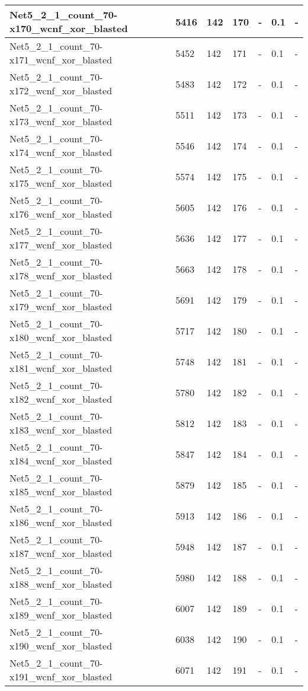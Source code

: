 \begin{scriptsize}
\begin{longtable}{|p{5cm}|l|l|l|l|l|l|}
Net5\_2\_1\_count\_70-x170\_wcnf\_xor\_blasted&5416&142&170&-&0.1&- \\ \hline 
Net5\_2\_1\_count\_70-x171\_wcnf\_xor\_blasted&5452&142&171&-&0.1&- \\ \hline 
Net5\_2\_1\_count\_70-x172\_wcnf\_xor\_blasted&5483&142&172&-&0.1&- \\ \hline 
Net5\_2\_1\_count\_70-x173\_wcnf\_xor\_blasted&5511&142&173&-&0.1&- \\ \hline 
Net5\_2\_1\_count\_70-x174\_wcnf\_xor\_blasted&5546&142&174&-&0.1&- \\ \hline 
Net5\_2\_1\_count\_70-x175\_wcnf\_xor\_blasted&5574&142&175&-&0.1&- \\ \hline 
Net5\_2\_1\_count\_70-x176\_wcnf\_xor\_blasted&5605&142&176&-&0.1&- \\ \hline 
Net5\_2\_1\_count\_70-x177\_wcnf\_xor\_blasted&5636&142&177&-&0.1&- \\ \hline 
Net5\_2\_1\_count\_70-x178\_wcnf\_xor\_blasted&5663&142&178&-&0.1&- \\ \hline 
Net5\_2\_1\_count\_70-x179\_wcnf\_xor\_blasted&5691&142&179&-&0.1&- \\ \hline 
Net5\_2\_1\_count\_70-x180\_wcnf\_xor\_blasted&5717&142&180&-&0.1&- \\ \hline 
Net5\_2\_1\_count\_70-x181\_wcnf\_xor\_blasted&5748&142&181&-&0.1&- \\ \hline 
Net5\_2\_1\_count\_70-x182\_wcnf\_xor\_blasted&5780&142&182&-&0.1&- \\ \hline 
Net5\_2\_1\_count\_70-x183\_wcnf\_xor\_blasted&5812&142&183&-&0.1&- \\ \hline 
Net5\_2\_1\_count\_70-x184\_wcnf\_xor\_blasted&5847&142&184&-&0.1&- \\ \hline 
Net5\_2\_1\_count\_70-x185\_wcnf\_xor\_blasted&5879&142&185&-&0.1&- \\ \hline 
Net5\_2\_1\_count\_70-x186\_wcnf\_xor\_blasted&5913&142&186&-&0.1&- \\ \hline 
Net5\_2\_1\_count\_70-x187\_wcnf\_xor\_blasted&5948&142&187&-&0.1&- \\ \hline 
Net5\_2\_1\_count\_70-x188\_wcnf\_xor\_blasted&5980&142&188&-&0.1&- \\ \hline 
Net5\_2\_1\_count\_70-x189\_wcnf\_xor\_blasted&6007&142&189&-&0.1&- \\ \hline 
Net5\_2\_1\_count\_70-x190\_wcnf\_xor\_blasted&6038&142&190&-&0.1&- \\ \hline 
Net5\_2\_1\_count\_70-x191\_wcnf\_xor\_blasted&6071&142&191&-&0.1&- \\ \hline 

\end{longtable}
\end{scriptsize}
